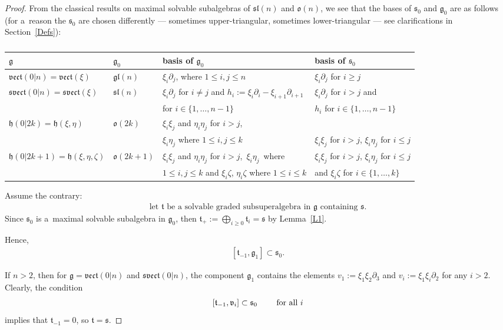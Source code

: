 \documentclass[pdftex]{sigma}
\newcommand{\del}{\partial}
\newcommand {\fg} {{\mathfrak{g}}} %
\newcommand {\fgl} {{\mathfrak{gl}}} %
\newcommand {\fh} {{\mathfrak{h}}}
\newcommand {\fo} {{\mathfrak{o}}}
\newcommand {\fs} {{\mathfrak{s}}}
\newcommand {\fsl} {{\mathfrak{sl}}}
\newcommand {\fsvect} {{\mathfrak{svect}}}
\newcommand {\ft} {{\mathfrak{t}}}
\newcommand {\fv} {{\mathfrak{v}}} %
\newcommand {\fvect} {{\mathfrak{vect}}} %
\newcommand {\<} [2] {{\left.\vphantom{#2}\right.^{#1\!}\!{#2}}}
\numberwithin{equation}{section}
\begin{document}
\begin{proof} From the classical results on maximal solvable subalgebras of $\fsl(n)$ and $\fo(n)$, we see that the bases of $\fs_0$ and $\fg_0$ are as follows (for a~reason the $\fs_0$ are chosen differently --- sometimes upper-triangular, sometimes lower-triangular --- see clarifications in Section~\ref{Defs}):

\begin{table}[!ht]\centering\renewcommand{\arraystretch}{1.2}
\footnotesize

\begin{tabular}{|l |l |l |l|}
\hline
$\fg$&$\fg_0$&basis of $\fg_0$&basis of $\fs_0$\\
\hline
$\fvect(0|n)=\fvect(\xi)$&$\fgl(n)$&$\xi_i\del_j$, where $1\leq i, j\leq n$&$\xi_i\del_j$ for $i\geq j$\\
\hline
$\fsvect(0|n)=\fsvect(\xi)$&$\fsl(n)$&$\xi_i\del_j$ for $i\neq j$ and $h_i:=\xi_i\del_i-\xi_{i+1}\del_{i+1}$&$\xi_i\del_j$ for $i> j$ and\\
 &&for $i\in\{1, \dots, n-1\}$&$h_i$ for $i\in\{1, \dots, n-1\}$\\
\hline
$\fh(0|2k)=\fh(\xi, \eta)$&$\fo(2k)$&$\xi_i\xi_j$ and $\eta_i\eta_j$ for $i> j$,&\\
&& $\xi_i\eta_j$ where
$1\leq i, j\leq k$&$\xi_i\xi_j$ for $i>j$,  $\xi_i\eta_j$ for $i\leq j$\\
\hline
$\fh(0|2k+1)=\fh(\xi, \eta, \zeta)$&$\fo(2k+1)$&$\xi_i\xi_j$ and $\eta_i\eta_j$ for $i> j$,\ $\xi_i\eta_j$\ where &$\xi_i\xi_j$ for $i>j$,  $\xi_i\eta_j$ for $i\leq j$ \\
 &&$1\leq i, j\leq k$ and $\xi_i\zeta$,  $\eta_i\zeta$ where $1\leq i\leq k$&and $\xi_i\zeta$ for $i\in\{1, \dots, k\}$\\
\hline
\end{tabular}
\caption{}\label{tab3}
\end{table}

Assume the contrary:
\begin{gather}\label{ft}
\text{let $\ft$ be a~solvable graded subsuperalgebra in $\fg$ containing $\fs$.}
\end{gather}
Since $\fs_0$ is a~maximal solvable subalgebra in $\fg_0$, then $\ft_+:=\bigoplus_{i\geq 0} \ft_i=\fs$ by Lemma~\ref{L1}.

Hence,
\begin{gather}\label{*}
[\ft_{-1}, \fg_1]\subset \fs_0.
\end{gather}

If $n>2$, then for $\fg=\fvect(0|n)$ and $\fsvect(0|n)$, the component $\fg_1$ contains the elements $v_1:=\xi_1\xi_2\del_3$ and $v_i:=\xi_1\xi_i\del_2$ for any $i>2$.
Clearly, the condition
\begin{gather}\label{test}
\text{$[\ft_{-1}, \fv_i]\subset \fs_0$ \qquad for all $i$}
\end{gather}
implies that $\ft_{-1}=0$, so $\ft=\fs$.


\end{proof}
\end{document}
